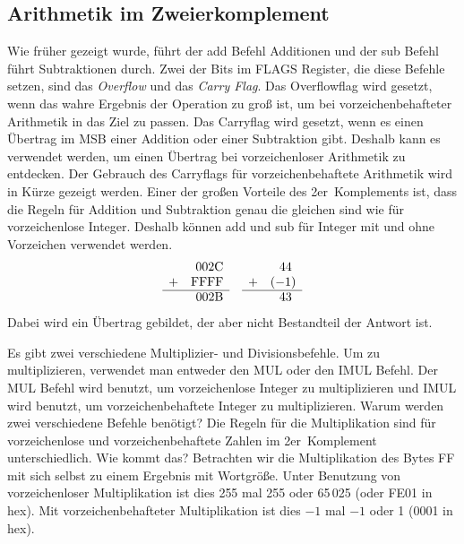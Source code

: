 
\subsection{Arithmetik im Zweierkomplement }

Wie fr\"{u}her gezeigt wurde, f\"{u}hrt der {\code add} Befehl Additionen
und der {\code sub} Befehl f\"{u}hrt Subtraktionen durch. Zwei der Bits
im FLAGS Register, die diese Befehle setzen, sind das
\emph{Overflow} und das \emph{Carry Flag}. Das Overflowflag wird
gesetzt, wenn das wahre Ergebnis der Operation zu gro{\ss} ist, um bei
vorzeichenbehafteter Arithmetik in das Ziel zu passen. Das Carryflag
wird gesetzt, wenn es einen \"{U}bertrag im MSB einer Addition oder
einer Subtraktion gibt. Deshalb kann es verwendet werden, um einen
\"{U}bertrag bei vorzeichenloser Arithmetik zu entdecken. Der Gebrauch
des Carryflags f\"{u}r vorzeichenbehaftete Arithmetik wird in K\"{u}rze
gezeigt werden. Einer der gro{\ss}en Vorteile des 2er~Komplements ist,
dass die Regeln f\"{u}r Addition und Subtraktion genau die gleichen sind
wie f\"{u}r vorzeichenlose Integer. Deshalb k\"{o}nnen {\code add} und
{\code sub} f\"{u}r Integer mit und ohne Vorzeichen verwendet werden.
\[
\begin{array}{rrcrr}
  & 002\mathrm{C} & & & 44~\\
 +& \mathrm{FFFF} & &+&(-1)\\
 \cline{1-2} \cline{4-5}
  & 002\mathrm{B} & & & 43~\\
\end{array}
\]
Dabei wird ein \"{U}bertrag gebildet, der aber nicht Bestandteil der
Antwort ist.

 
 Es gibt zwei verschiedene
Multiplizier- und Divisionsbefehle. Um zu multiplizieren, verwendet
man entweder den {\code MUL} oder den {\code IMUL} Befehl. Der
{\code MUL} Befehl wird benutzt, um vorzeichenlose Integer zu
multiplizieren und {\code IMUL} wird benutzt, um vorzeichenbehaftete
Integer zu multiplizieren. Warum werden zwei verschiedene Befehle
ben\"{o}tigt? Die Regeln f\"{u}r die Multiplikation sind f\"{u}r vorzeichenlose
und vorzeichenbehaftete Zahlen im 2er~Komplement unterschiedlich.
Wie kommt das? Betrachten wir die Multiplikation des Bytes FF mit
sich selbst zu einem Ergebnis mit Wortgr\"{o}{\ss}e. Unter Benutzung von
vorzeichenloser Multiplikation ist dies 255 mal 255 oder 65\,025
(oder FE01 in hex). Mit vorzeichenbehafteter Multiplikation ist dies
$-1$ mal $-1$ oder 1 (0001 in hex).

